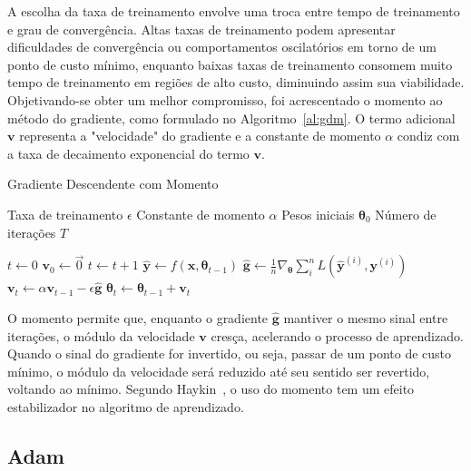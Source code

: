 A escolha da taxa de treinamento envolve uma troca entre tempo de treinamento e grau de convergência.
Altas taxas de treinamento podem apresentar dificuldades de convergência ou comportamentos oscilatórios em torno de um
ponto de custo mínimo, enquanto baixas taxas de treinamento consomem muito tempo de treinamento em regiões de alto
custo, diminuindo assim sua viabilidade.
Objetivando-se obter um melhor compromisso, foi acrescentado o momento ao método do gradiente, como formulado no
Algoritmo~\ref{al:gdm}.
O termo adicional $\mathbf{v}$ representa a "velocidade" do gradiente e a constante de momento $\alpha$ condiz com a
taxa de decaimento exponencial do termo $\mathbf{v}$.

\begin{algorithm}
    \caption{Gradiente Descendente com Momento}
    \label{al:gdm}
    \begin{algorithmic}[1]
        \Require Taxa de treinamento $\epsilon$
        \Require Constante de momento $\alpha$
        \Require Pesos iniciais $\boldsymbol{\theta}_{0}$
        \Require Número de iterações $T$

        \State $t \gets 0$
        \State $\mathbf{v}_{0} \gets \vec{0}$
            \State $t \gets t + 1$
            \State $\mathbf{\hat{y}} \gets f(\mathbf{x}, \boldsymbol{\theta}_{t-1})$
            \State $\mathbf{\hat{g}} \gets \frac{1}{n} \nabla_{\boldsymbol{\theta}} \sum_i^n L(\mathbf{\hat{y}}^{(i)}, \mathbf{y}^{(i)})$
            \State $\mathbf{v}_{t} \gets \alpha \mathbf{v}_{t-1} - \epsilon \mathbf{\hat{g}}$
            \State $\boldsymbol{\theta}_{t} \gets \boldsymbol{\theta}_{t-1} + \mathbf{v}_t$
        \EndWhile
    \end{algorithmic}
\end{algorithm}

O momento permite que, enquanto o gradiente $\mathbf{\hat{g}}$ mantiver o mesmo sinal entre iterações, o módulo da
velocidade $\mathbf{v}$ cresça, acelerando o processo de aprendizado.
Quando o sinal do gradiente for invertido, ou seja, passar de um ponto de custo mínimo, o módulo da velocidade será
reduzido até seu sentido ser revertido, voltando ao mínimo.
Segundo Haykin~\cite{haykin09}, o uso do momento tem um efeito estabilizador no algoritmo de aprendizado.

\subsection{Adam}

